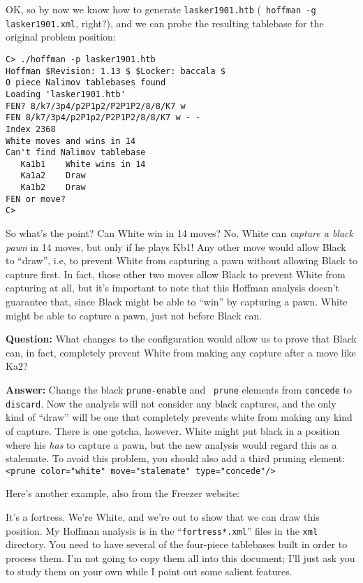 \documentclass[11pt]{article}
\begin{document}
OK, so by now we know how to generate {\tt lasker1901.htb} ({\tt
hoffman -g lasker1901.xml}, right?), and we can probe the resulting
tablebase for the original problem position:

\begin{verbatim}
C> ./hoffman -p lasker1901.htb
Hoffman $Revision: 1.13 $ $Locker: baccala $
0 piece Nalimov tablebases found
Loading 'lasker1901.htb'
FEN? 8/k7/3p4/p2P1p2/P2P1P2/8/8/K7 w
FEN 8/k7/3p4/p2P1p2/P2P1P2/8/8/K7 w - -
Index 2368
White moves and wins in 14
Can't find Nalimov tablebase
   Ka1b1    White wins in 14
   Ka1a2    Draw
   Ka1b2    Draw
FEN or move?
C>
\end{verbatim}

So what's the point?  Can White win in 14 moves?  No.  White can {\it
capture a black pawn} in 14 moves, but only if he plays Kb1!  Any
other move would allow Black to ``draw'', i.e, to prevent White from
capturing a pawn without allowing Black to capture first.  In fact,
those other two moves allow Black to prevent White from capturing at
all, but it's important to note that this Hoffman analysis doesn't
guarantee that, since Black might be able to ``win'' by capturing a
pawn.  White might be able to capture a pawn, just not before Black
can.

{\bf Question:} What changes to the configuration would allow us to
prove that Black can, in fact, completely prevent White from making
any capture after a move like Ka2?

{\bf Answer:} Change the black {\tt prune-enable} and {\tt
prune} elements from {\tt concede} to {\tt discard}.  Now the analysis
will not consider any black captures, and the only kind of ``draw''
will be one that completely prevents white from making any kind of
capture.  There is one gotcha, however.  White might put black in a
position where his {\it has} to capture a pawn, but the new analysis
would regard this as a stalemate.  To avoid this problem, you should
also add a third pruning element: {\tt <prune color="white"
move="stalemate" type="concede"/>}

Here's another example, also from the Freezer website:

\showboard

It's a fortress.  We're White, and we're out to show that we can draw
this position.  My Hoffman analysis is in the ``{\tt fortress*.xml}''
files in the {\tt xml} directory.  You need to have several of
the four-piece tablebases built in order to process them.  I'm not
going to copy them all into this document; I'll just ask you to study
them on your own while I point out some salient features.
\end{document}
